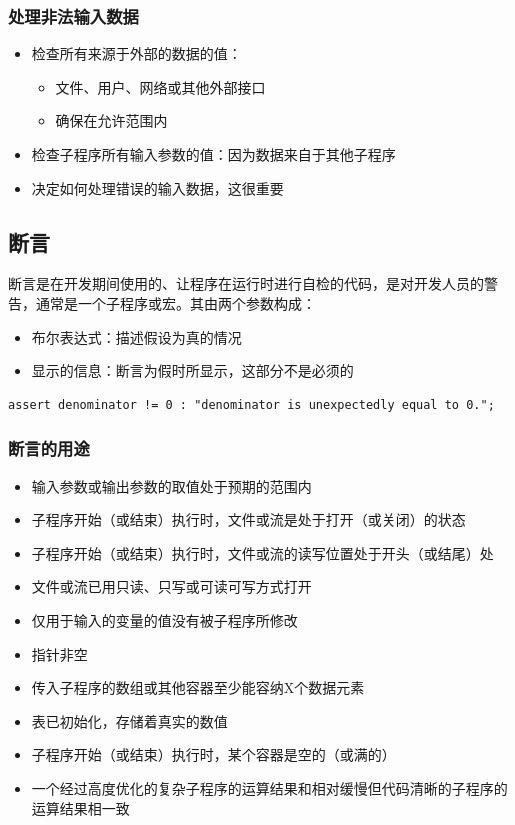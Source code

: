 \subsubsection{处理非法输入数据}
\begin{itemize}
    \item 检查所有来源于外部的数据的值：
    \begin{itemize}
        \item 文件、用户、网络或其他外部接口
        \item 确保在允许范围内
    \end{itemize}
    \item 检查子程序所有输入参数的值：因为数据来自于其他子程序
    \item 决定如何处理错误的输入数据，这很重要
\end{itemize}


\subsection{断言}
断言是在开发期间使用的、让程序在运行时进行自检的代码，是对开发人员的警告，通常是一个子程序或宏。其由两个参数构成：
\begin{itemize}
    \item 布尔表达式：描述假设为真的情况
    \item 显示的信息：断言为假时所显示，这部分不是必须的
\end{itemize}

\begin{lstlisting}
assert denominator != 0 : "denominator is unexpectedly equal to 0.";
\end{lstlisting}

\subsubsection{断言的用途}
\begin{itemize}
    \item 输入参数或输出参数的取值处于预期的范围内
    \item 子程序开始（或结束）执行时，文件或流是处于打开（或关闭）的状态
    \item 子程序开始（或结束）执行时，文件或流的读写位置处于开头（或结尾）处
    \item 文件或流已用只读、只写或可读可写方式打开
    \item 仅用于输入的变量的值没有被子程序所修改
    \item 指针非空
    \item 传入子程序的数组或其他容器至少能容纳X个数据元素
    \item 表已初始化，存储着真实的数值
    \item 子程序开始（或结束）执行时，某个容器是空的（或满的）
    \item 一个经过高度优化的复杂子程序的运算结果和相对缓慢但代码清晰的子程序的运算结果相一致
\end{itemize}

